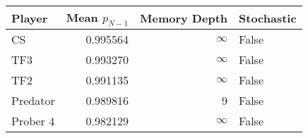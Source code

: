 \begin{tabular}{lrrl}
\toprule
   Player &  Mean $p_{N-1}$ &  Memory Depth & Stochastic \\
\midrule
       CS &        0.995564 &            \(\infty\) &      False \\
      TF3 &        0.993270 &            \(\infty\) &      False \\
      TF2 &        0.991135 &            \(\infty\) &      False \\
 Predator &        0.989816 &             9 &      False \\
 Prober 4 &        0.982129 &            \(\infty\) &      False \\
\bottomrule
\end{tabular}
